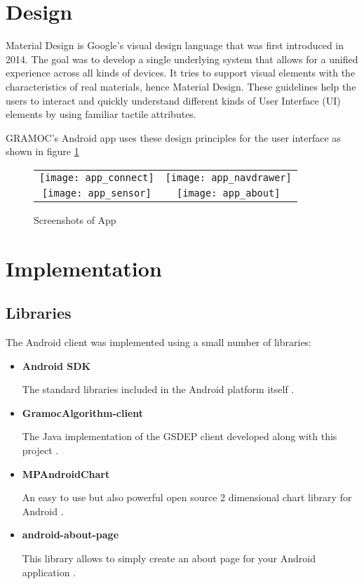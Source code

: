 \section{Design}
Material Design is Google's visual design language that was first introduced in 2014. The goal was to develop a single underlying system that allows for a unified experience across all kinds of devices. It tries to support visual elements with the characteristics of real materials, hence Material Design. These guidelines help the users to interact and quickly understand different kinds of User Interface (UI) elements by using familiar tactile attributes.

GRAMOC's Android app uses these design principles for the user interface as shown in figure \ref{fig:appscreenshots}

\begin{figure}[H]
	\centering
	\begin{tabular}{cc}
	\texttt{[image: app\_connect]}
	&
	\texttt{[image: app\_navdrawer]}
	\\
	\texttt{[image: app\_sensor]}
	&
	\texttt{[image: app\_about]}
	\end{tabular}
	\caption{Screenshots of App}
	\label{fig:appscreenshots}
\end{figure}

\section{Implementation}

\subsection{Libraries}
The Android client was implemented using a small number of libraries:
\begin{itemize}
	\item \textbf{Android SDK}

	The standard libraries included in the Android platform itself \cite{AndroidSDK}.

	\item \textbf{GramocAlgorithm-client}

	The Java implementation of the GSDEP client developed along with this project \cite{GramocAlgorithm-client}.

	\item \textbf{MPAndroidChart}

	An easy to use but also powerful open source 2 dimensional chart library for Android \cite{MPAndroidChart}.

	\item \textbf{android-about-page}

	This library allows to simply create an about page for your Android application \cite{android-about-page}.
\end{itemize}

